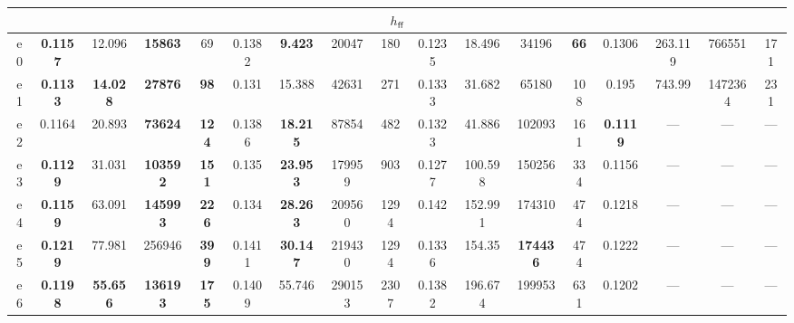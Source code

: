 \begin{tabular}{||c||c|c|c|c||c|c|c|c||c|c|c|c||c|c|c|c||}
\hline%
\multicolumn{17}{||c||}{$h_{\mathsf{ff}}$}\\%
\hline%
e0&\small{\textbf{0.1157}}&\small{12.096}&\small{\textbf{15863}}&\small{69}&\small{0.1382}&\small{\textbf{9.423}}&\small{20047}&\small{180}&\small{0.1235}&\small{18.496}&\small{34196}&\small{\textbf{66}}&\small{0.1306}&\small{263.119}&\small{766551}&\small{171}\\%
\hline%
e1&\small{\textbf{0.1133}}&\small{\textbf{14.028}}&\small{\textbf{27876}}&\small{\textbf{98}}&\small{0.131}&\small{15.388}&\small{42631}&\small{271}&\small{0.1333}&\small{31.682}&\small{65180}&\small{108}&\small{0.195}&\small{743.99}&\small{1472364}&\small{231}\\%
\hline%
e2&\small{0.1164}&\small{20.893}&\small{\textbf{73624}}&\small{\textbf{124}}&\small{0.1386}&\small{\textbf{18.215}}&\small{87854}&\small{482}&\small{0.1323}&\small{41.886}&\small{102093}&\small{161}&\small{\textbf{0.1119}}&\small{---}&\small{---}&\small{---}\\%
\hline%
e3&\small{\textbf{0.1129}}&\small{31.031}&\small{\textbf{103592}}&\small{\textbf{151}}&\small{0.135}&\small{\textbf{23.953}}&\small{179959}&\small{903}&\small{0.1277}&\small{100.598}&\small{150256}&\small{334}&\small{0.1156}&\small{---}&\small{---}&\small{---}\\%
\hline%
e4&\small{\textbf{0.1159}}&\small{63.091}&\small{\textbf{145993}}&\small{\textbf{226}}&\small{0.134}&\small{\textbf{28.263}}&\small{209560}&\small{1294}&\small{0.142}&\small{152.991}&\small{174310}&\small{474}&\small{0.1218}&\small{---}&\small{---}&\small{---}\\%
\hline%
e5&\small{\textbf{0.1219}}&\small{77.981}&\small{256946}&\small{\textbf{399}}&\small{0.1411}&\small{\textbf{30.147}}&\small{219430}&\small{1294}&\small{0.1336}&\small{154.35}&\small{\textbf{174436}}&\small{474}&\small{0.1222}&\small{---}&\small{---}&\small{---}\\%
\hline%
e6&\small{\textbf{0.1198}}&\small{\textbf{55.656}}&\small{\textbf{136193}}&\small{\textbf{175}}&\small{0.1409}&\small{55.746}&\small{290153}&\small{2307}&\small{0.1382}&\small{196.674}&\small{199953}&\small{631}&\small{0.1202}&\small{---}&\small{---}&\small{---}\\%
\hline%
\end{tabular}